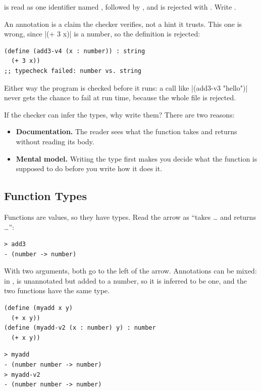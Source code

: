 \begin{pitfall}
 is read as one identifier named , followed by , and is rejected with . Write .
\end{pitfall}

An annotation is a claim the checker verifies, not a hint it trusts. This one is wrong, since \rkt|(+ 3 x)| is a number, so the definition is rejected:
\begin{lstlisting}
(define (add3-v4 (x : number)) : string
  (+ 3 x))
;; typecheck failed: number vs. string
\end{lstlisting}
Either way the program is checked before it runs: a call like \rkt|(add3-v3 "hello")| never gets the chance to fail at run time, because the whole file is rejected.

If the checker can infer the types, why write them? There are two reasons:
\begin{itemize}
  \item \textbf{Documentation.} The reader sees what the function takes and returns without reading its body.
  \item \textbf{Mental model.} Writing the type first makes you decide what the function is supposed to do before you write how it does it.
\end{itemize}

\subsection{Function Types}
\label{sec:fntypes}

Functions are values, so they have types. Read the arrow as ``takes \ldots{} and returns \ldots'':
\begin{lstlisting}[style=repl]
> add3
- (number -> number)
\end{lstlisting}
With two arguments, both go to the left of the arrow. Annotations can be mixed: in ,  is unannotated but added to a number, so it is inferred to be one, and the two functions have the same type.
\begin{lstlisting}
(define (myadd x y)
  (+ x y))
(define (myadd-v2 (x : number) y) : number
  (+ x y))
\end{lstlisting}
\begin{lstlisting}[style=repl]
> myadd
- (number number -> number)
> myadd-v2
- (number number -> number)
\end{lstlisting}

